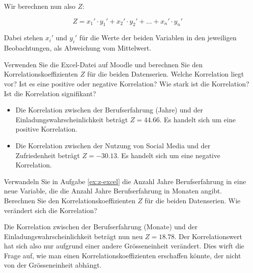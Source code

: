 Wir berechnen nun also \(Z\):

\[
    Z = x_1' \cdot y_1' + x_2' \cdot y_2' + \dots + x_n' \cdot y_n'
\]

Dabei stehen \( x_i' \) und \( y_i' \) für die Werte der beiden Variablen in den jeweiligen Beobachtungen, als Abweichung vom Mittelwert.


\begin{myexercise}\label{ex:z-excel}
    Verwenden Sie die Excel-Datei auf Moodle und berechnen Sie den Korrelationskoeffizienten \(Z\) für die beiden Datenserien. Welche Korrelation liegt vor? Ist es eine positive oder negative Korrelation? Wie stark ist die Korrelation? Ist die Korrelation signifikant?
    \begin{myanswer}
        \begin{itemize}
            \item Die Korrelation zwischen der Berufserfahrung (Jahre) und der Einladungswahrscheinlichkeit beträgt \(Z = 44.66\). Es handelt sich um eine positive Korrelation.
            \item Die Korrelation zwischen der Nutzung von Social Media und der Zufriedenheit beträgt \(Z = -30.13\). Es handelt sich um eine negative Korrelation.
        \end{itemize}
    \end{myanswer}
\end{myexercise}
\begin{myexercise}\label{ex:z-excel2}
    Verwandeln Sie in Aufgabe \cref{ex:z-excel} die Anzahl Jahre Berufserfahrung in eine neue Variable, die die Anzahl Jahre Berufserfahrung in Monaten angibt. Berechnen Sie den Korrelationskoeffizienten \(Z\) für die beiden Datenserien. Wie verändert sich die Korrelation?
    \begin{myanswer}
        Die Korrelation zwischen der Berufserfahrung (Monate) und der Einladungswahrscheinlichkeit beträgt nun neu \(Z = 18.78\). Der Korrelationswert hat sich also nur aufgrund einer andere Grösseneinheit verändert. Dies wirft die Frage auf, wie man einen Korrelationskoeffizienten erschaffen könnte, der nicht von der Grösseneinheit abhängt.
    \end{myanswer}
\end{myexercise}

